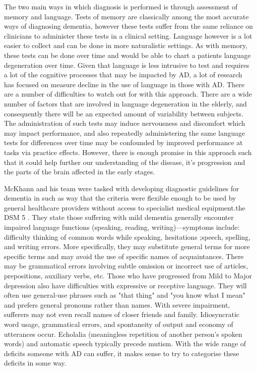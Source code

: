 \par
The two main ways in which diagnosis is performed is through assessment of memory and language. Tests of memory are classically among the most accurate ways of diagnosing dementia, however these tests suffer from the same reliance on clinicians to administer these tests in a clinical setting. Language however is a lot easier to collect and can be done in more naturalistic settings. As with memory, these tests can be done over time and would be able to chart a patients language degeneration over time. Given that language is less intrusive to test and requires a lot of the cognitive processes that may be impacted by AD, a lot of research has focused on measure decline in the use of language in those with AD. There are a number of difficulties to watch out for with this approach. There are a wide number of factors that are involved in language degeneration in the elderly, and consequently there will be an expected amount of variability between subjects. The administration of such tests may induce nervousness and discomfort which may impact performance, and also repeatedly administering the same language tests for differences over time may be confounded by improved performance at tasks via practice effects. However, there is enough promise in this approach such that it could help further our understanding of the disease, it's progression and the parts of the brain affected in the early stages.
\par
McKhann and his team were tasked with developing diagnostic guidelines for dementia in such as way that the criteria were flexible enough to be used by general healthcare providers without access to specialist medical equipment.the DSM 5 \cite{McKhann2011}. They state those suffering with mild dementia generally encounter impaired language functions (speaking, reading, writing)––symptoms include: difficulty thinking of common words while speaking, hesitations ;speech, spelling, and writing errors. More specifically, they may substitute general terms for more specific terms and may avoid the use of specific names of acquaintances. There may be grammatical errors involving subtle omission or incorrect use of articles, prepositions, auxiliary verbs, etc. Those who have progressed from Mild to Major depression also have difficulties with expressive or receptive language. They will often use general-use phrases such as "that thing" and "you know what I mean" and prefers general pronouns rather than names. With severe impairment, sufferers may not even recall names of closer friends and family. Idiosyncratic word usage, grammatical errors, and spontaneity of output and economy of utterances occur. Echolalia (meaningless repetition of another person's spoken words) and automatic speech typically precede mutism. With the wide range of deficits someone with AD can suffer, it makes sense to try to categorise these deficits in some way.
